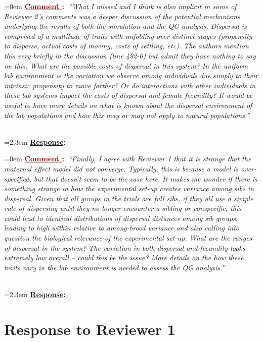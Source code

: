 \documentclass[12pt]{article}
\newcounter{cN}
\newcommand{\comment}[1]{
	\vspace{2em}
	\refstepcounter{cN} %
	\noindent \hangindent=0em \textbf{\textcolor{Maroon}{\uline{Comment \thecN}:~}}\emph{``#1''}
	}
\newcommand{\response}[1]{
	\\[0.25em]
	\hangindent=2.3em \textbf{\textcolor{NavyBlue}{\uline{Response}:~}}#1
	}
\begin{document}
\comment{What I missed and I think is also implicit in some of Reviewer 2’s comments was a deeper discussion of the potential mechanisms underlying the results of both the simulation and the QG analysis. 
Dispersal is comprised of a multitude of traits with unfolding over distinct stages (propensity to disperse, actual costs of moving, costs of settling, etc). 
The authors mention this very briefly in the discussion (line 492-6) but admit they have nothing to say on this. 
What are the possible costs of dispersal in this system? 
In the uniform lab environment is the variation we observe among individuals due simply to their intrinsic propensity to move farther? 
Or do interactions with other individuals in these lab systems impact the costs of dispersal and female fecundity? 
It would be useful to have more details on what is known about the dispersal environment of the lab populations and how this may or may not apply to natural populations.}
\response{}

\comment{Finally, I agree with Reviewer 1 that it is strange that the maternal effect model did not converge. 
Typically, this is because a model is over-specified, but that doesn’t seem to be the case here. 
It makes me wonder if there is something strange in how the experimental set-up creates variance among sibs in dispersal. 
Given that all groups in the trials are full sibs, if they all use a simple rule of dispersing until they no longer encounter a sibling or conspecific, this could lead to identical distributions of dispersal distances among sib groups, leading to high within relative to among-brood variance and also calling into question the biological relevance of the experimental set-up. 
What are the ranges of dispersal in the system? The variation in both dispersal and fecundity looks extremely low overall – could this be the issue? 
More details on the how these traits vary in the lab environment is needed to assess the QG analysis.}
\response{}

\section{Response to Reviewer 1}
\vspace{-2em}
\end{document}
